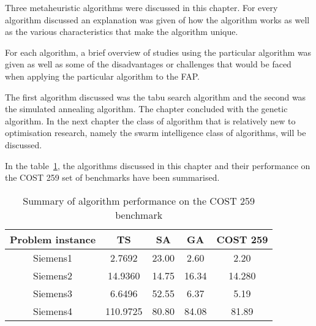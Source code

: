 Three metaheuristic algorithms were discussed in this chapter. For every algorithm discussed an explanation was given of how the algorithm works as well as the various characteristics that make the algorithm unique.

For each algorithm, a brief overview of studies using the particular algorithm was given as well as some of the disadvantages or challenges that would be faced when applying the particular algorithm to the FAP.

The first algorithm discussed was the tabu search algorithm and the second was the simulated annealing algorithm. The chapter concluded with the genetic algorithm. In the next chapter the class of algorithm that is relatively new to optimisation research, namely the swarm intelligence class of algorithms, will be discussed.

In the table~\ref{tab:summary1}, the algorithms discussed in this chapter and their performance on the COST 259 set of benchmarks have been summarised.
\begin{table}[H]
\label{tbl:summaryMetaTable}
\begin{center}
	\begin{tabular}{| c | c | c | c | c |}
	\hline
	Problem instance & TS & SA & GA & COST 259 \\ \hline
	Siemens1 & 2.7692 & 23.00 & 2.60 & 2.20 \\ \hline
	Siemens2 & 14.9360 & 14.75 & 16.34 & 14.280 \\ \hline
	Siemens3 & 6.6496 & 52.55 & 6.37 & 5.19 \\ \hline
	Siemens4 & 110.9725 & 80.80 & 84.08 & 81.89 \\ \hline
	\end{tabular}
\caption{Summary of algorithm performance on the COST 259 benchmark}
\label{tab:summary1}
\end{center}
\end{table}
